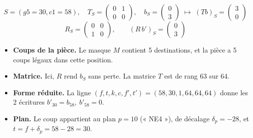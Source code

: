 \[ S = (g5=30, c1=58),\quad T_S = \begin{pmatrix}0 & 1 \\ 0 & 0\end{pmatrix},\quad b_S = \begin{pmatrix}0 \\ 3\end{pmatrix}\;\longmapsto\; (Tb)_S =\begin{pmatrix}3 \\ 0\end{pmatrix} \]
\[ R_S = \begin{pmatrix}0 & 0 \\ 1 & 0\end{pmatrix},\qquad (R\,b')_S = \begin{pmatrix}0 \\ 3\end{pmatrix} \]
\begin{itemize}
\item \textbf{Coups de la pièce.} Le masque $M$ contient 5 destinations, et la pièce a 5 coups légaux dans cette position.
\item \textbf{Matrice.} Ici, $R$ rend $b_S$ sans perte. La matrice $T$ est de rang 63 sur 64.
\item \textbf{Forme réduite.} La ligne $(f, t, k, c, f', t') = (58, 30, 1, 64, 64, 64)$ donne les 2 écritures $b'_{30} = b_{58},\ b'_{58} = 0$.
\item \textbf{Plan.} Le coup appartient au plan $p = 10$ (« NE4 »), de décalage $\delta_p = -28$, et $t = f + \delta_p = 58 -28 = 30$.
\end{itemize}
